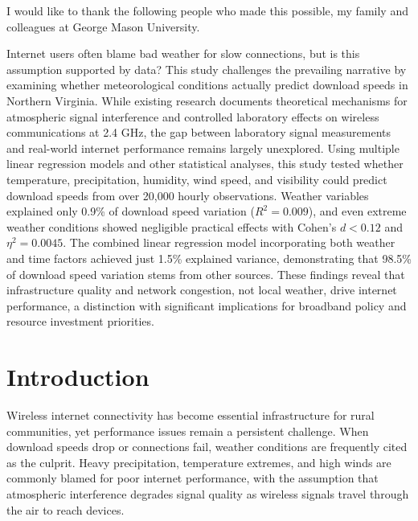 \documentclass[11pt]{report}
\begin{document}

\acknowledgementspage

\noindent I would like to thank the following people who made this possible, my family and colleagues at George Mason University.


\tableofcontents

\listoftables

\listoffigures

\abstractpage

Internet users often blame bad weather for slow connections, but is this assumption supported by data? This study challenges the prevailing narrative by examining whether meteorological conditions actually predict download speeds in Northern Virginia. While existing research documents theoretical mechanisms for atmospheric signal interference and controlled laboratory effects on wireless communications at 2.4 GHz, the gap between laboratory signal measurements and real-world internet performance remains largely unexplored. Using multiple linear regression models and other statistical analyses, this study tested whether temperature, precipitation, humidity, wind speed, and visibility could predict download speeds from over 20,000 hourly observations. Weather variables explained only 0.9\% of download speed variation ($R^2 = 0.009$), and even extreme weather conditions showed negligible practical effects with Cohen's $d < 0.12$ and $\eta^2 = 0.0045$. The combined linear regression model incorporating both weather and time factors achieved just 1.5\% explained variance, demonstrating that 98.5\% of download speed variation stems from other sources. These findings reveal that infrastructure quality and network congestion, not local weather, drive internet performance, a distinction with significant implications for broadband policy and resource investment priorities.

\startofchapters

\chapter{Introduction}

Wireless internet connectivity has become essential infrastructure for rural communities, yet performance issues remain a persistent challenge. When download speeds drop or connections fail, weather conditions are frequently cited as the culprit. Heavy precipitation, temperature extremes, and high winds are commonly blamed for poor internet performance, with the assumption that atmospheric interference degrades signal quality as wireless signals travel through the air to reach devices\cite{allconnect_weather_internet}.
\end{document}
